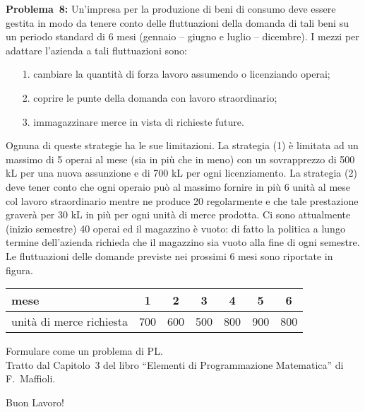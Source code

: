 \documentclass[11pt]{article}
\begin{document}
{\sc \bf Problema~8\/:}
Un'impresa per la produzione di beni di consumo
deve essere gestita in modo da tenere conto delle
fluttuazioni della domanda di tali beni su un periodo
standard di 6 mesi (gennaio -- giugno e luglio -- dicembre).
I mezzi per adattare l'azienda
a tali fluttuazioni sono:
\begin{itemize}
   \item[1.] cambiare la quantit\`a di forza lavoro assumendo
         o licenziando operai;
   \item[2.] coprire le punte della domanda con lavoro straordinario;
   \item[3.] immagazzinare merce in vista di richieste future.
\end{itemize}

Ognuna di queste strategie ha le sue limitazioni.
La strategia (1) \`e limitata ad un massimo di 5 operai al mese
(sia in pi\`u che in meno) con un sovrapprezzo
di 500 kL per una nuova assunzione e di 700 kL per ogni licenziamento.
La strategia (2) deve tener conto che ogni operaio pu\`o al massimo
fornire in pi\`u 6 unit\`a al mese col lavoro straordinario
mentre ne produce 20 regolarmente e che tale prestazione
graver\`a per 30 kL in pi\`u per ogni unit\`a di merce prodotta.
Ci sono attualmente (inizio semestre)
40 operai ed il magazzino \`e vuoto:
di fatto la politica a lungo
termine dell'azienda richieda che il magazzino sia vuoto
alla fine di ogni semestre.
Le fluttuazioni delle domande previste nei prossimi
6 mesi sono riportate in figura.

\begin{center}
\begin{tabular}{||l|cccccc||} \hline \hline
   mese & 1 & 2 & 3 & 4 & 5 & 6 \\
\hline
   unit\`a di merce richiesta & 700 & 600 & 500 & 800 & 900 & 800 \\
\hline
\end{tabular}
\end{center}

Formulare come un problema di PL.\\

Tratto dal Capitolo~3
del libro ``Elementi di Programmazione Matematica'' 
di F.~Maffioli.\\

\bigskip


Buon Lavoro!
\end{document}
